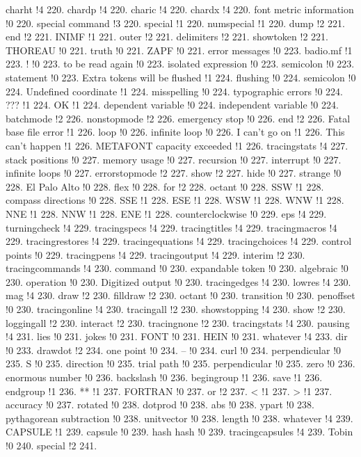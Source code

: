 charht !4 220.
chardp !4 220.
charic !4 220.
chardx !4 220.
font metric information !0 220.
special command !3 220.
special !1 220.
numspecial !1 220.
dump !2 221.
end !2 221.
INIMF !1 221.
outer !2 221.
delimiters !2 221.
showtoken !2 221.
THOREAU !0 221.
truth !0 221.
ZAPF !0 221.
error messages !0 223.
badio.mf !1 223.
! !0 223.
to be read again !0 223.
isolated expression !0 223.
semicolon !0 223.
statement !0 223.
Extra tokens will be flushed !1 224.
flushing !0 224.
semicolon !0 224.
Undefined coordinate !1 224.
misspelling !0 224.
typographic errors !0 224.
??? !1 224.
OK !1 224.
dependent variable !0 224.
independent variable !0 224.
batchmode !2 226.
nonstopmode !2 226.
emergency stop !0 226.
end !2 226.
Fatal base file error !1 226.
loop !0 226.
infinite loop !0 226.
I can't go on !1 226.
This can't happen !1 226.
METAFONT capacity exceeded !1 226.
tracingstats !4 227.
stack positions !0 227.
memory usage !0 227.
recursion !0 227.
interrupt !0 227.
infinite loops !0 227.
errorstopmode !2 227.
show !2 227.
hide !0 227.
strange !0 228.
El Palo Alto !0 228.
flex !0 228.
for !2 228.
octant !0 228.
SSW !1 228.
compass directions !0 228.
SSE !1 228.
ESE !1 228.
WSW !1 228.
WNW !1 228.
NNE !1 228.
NNW !1 228.
ENE !1 228.
counterclockwise !0 229.
eps !4 229.
turningcheck !4 229.
tracingspecs !4 229.
tracingtitles !4 229.
tracingmacros !4 229.
tracingrestores !4 229.
tracingequations !4 229.
tracingchoices !4 229.
control points !0 229.
tracingpens !4 229.
tracingoutput !4 229.
interim !2 230.
tracingcommands !4 230.
command !0 230.
ex\-pand\-able token !0 230.
algebraic !0 230.
operation !0 230.
Digitized output !0 230.
tracingedges !4 230.
lowres !4 230.
mag !4 230.
draw !2 230.
filldraw !2 230.
octant !0 230.
transition !0 230.
penoffset !0 230.
tracingonline !4 230.
tracingall !2 230.
showstopping !4 230.
show !2 230.
loggingall !2 230.
interact !2 230.
tracingnone !2 230.
tracingstats !4 230.
pausing !4 231.
lies !0 231.
jokes !0 231.
FONT !0 231.
HEIN !0 231.
whatever !4 233.
dir !0 233.
drawdot !2 234.
one point !0 234.
-- !0 234.
curl !0 234.
perpendicular !0 235.
S !0 235.
direction !0 235.
trial path !0 235.
perpendicular !0 235.
zero !0 236.
enormous number !0 236.
backslash !0 236.
begingroup !1 236.
save !1 236.
endgroup !1 236.
** !1 237.
FORTRAN !0 237.
or !2 237.
< !1 237.
> !1 237.
accuracy !0 237.
rotated !0 238.
dotprod !0 238.
abs !0 238.
ypart !0 238.
pythagorean subtraction !0 238.
unitvector !0 238.
length !0 238.
whatever !4 239.
CAPSULE !1 239.
capsule !0 239.
hash hash !0 239.
tracingcapsules !4 239.
Tobin !0 240.
special !2 241.
